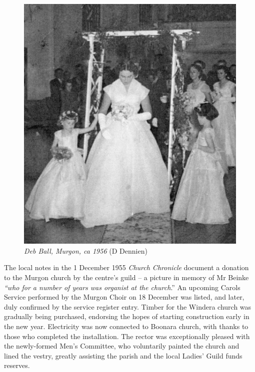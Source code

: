 \begin{figure}
\begin{center}
\includegraphics[width=.9\linewidth,center]{../images/debBallMurgon.jpg}
\caption{{\itshape Deb Ball, Murgon, ca 1956} {\scriptsize(D Dennien)}}
\end{center}
\end{figure}




The local notes in the 1 December 1955 \emph{Church Chronicle} document a donation to the Murgon church by the centre's guild -- a picture in memory of Mr Beinke \emph{``who for a number of years was organist at the church}.'' An upcoming Carols Service performed by the Murgon Choir on 18 December was listed, and later, duly confirmed by the service register entry. Timber for the Windera church was gradually being purchased, endorsing the hopes of starting construction early in the new year. Electricity was now connected to Boonara church, with thanks to those who completed the installation. The rector was exceptionally pleased with the newly-formed Men's Committee, who voluntarily painted the church and lined the vestry, greatly assisting the parish and the local Ladies' Guild funds reserves.



